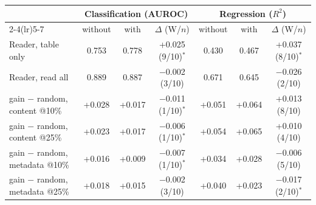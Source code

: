 \begin{tabular}{@{}lcccccc@{}}
\toprule
 & \multicolumn{3}{c}{Classification (AUROC)} & \multicolumn{3}{c}{Regression ($R^2$)} \\
\cmidrule(lr){2-4}\cmidrule(lr){5-7}
 & without & with & $\Delta$ (W/$n$) & without & with & $\Delta$ (W/$n$) \\
\midrule
Reader, table only & 0.753 & 0.778 & +0.025 (9/10)$^{*}$ & 0.430 & 0.467 & +0.037 (8/10)$^{*}$ \\
Reader, read all & 0.889 & 0.887 & $-$0.002 (3/10) & 0.671 & 0.645 & $-$0.026 (2/10) \\
gain $-$ random, content @10\% & +0.028 & +0.017 & $-$0.011 (1/10)$^{*}$ & +0.051 & +0.064 & +0.013 (8/10) \\
gain $-$ random, content @25\% & +0.023 & +0.017 & $-$0.006 (1/10)$^{*}$ & +0.054 & +0.065 & +0.010 (4/10) \\
gain $-$ random, metadata @10\% & +0.016 & +0.009 & $-$0.007 (1/10)$^{*}$ & +0.034 & +0.028 & $-$0.006 (5/10) \\
gain $-$ random, metadata @25\% & +0.018 & +0.015 & $-$0.002 (3/10) & +0.040 & +0.023 & $-$0.017 (2/10)$^{*}$ \\
\bottomrule
\end{tabular}
